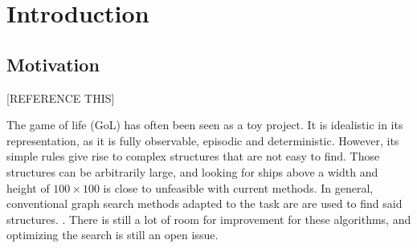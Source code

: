\documentclass{l4proj}
\begin{document}
\tableofcontents

%
%
%
%
%
%
%
%
\chapter{Introduction}


\section{Motivation}

[REFERENCE THIS]

The game of life (GoL) has often been seen as a toy project. It is idealistic in its representation, as it is fully observable, episodic and deterministic. However, its simple rules give rise to complex structures that are not easy to find. Those structures can be arbitrarily large, and looking for ships above a width and height of $100 \times 100$ is close to unfeasible with current methods. In general, conventional graph search methods adapted to the task are are used to find said structures. \cite{list_of_search_algorithms}. There is still a lot of room for improvement for these algorithms, and optimizing the search is still an open issue.
\end{document}
